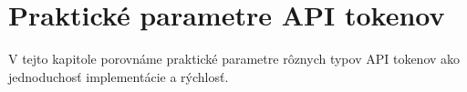 \chapter{Praktické parametre API tokenov}

\label{kap:prakticke} %

V tejto kapitole porovnáme praktické parametre rôznych typov API tokenov ako jednoduchosť implementácie a rýchlosť. 
